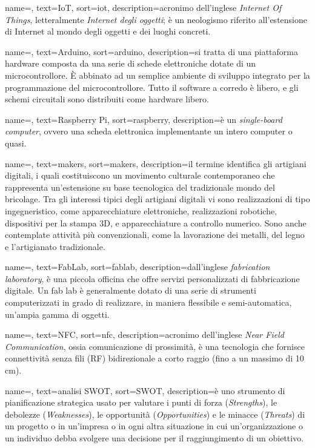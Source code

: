{
	name=,
    text=IoT,
    sort=iot,
    description={acronimo dell'inglese \textit{Internet Of Things}, letteralmente \textit{Internet degli oggetti}; è un neologismo riferito all'estensione di Internet al mondo degli oggetti e dei luoghi concreti.}
}

{
	name=,
    text=Arduino,
    sort=arduino,
    description={si tratta di una piattaforma hardware composta da una serie di schede elettroniche dotate di un microcontrollore. È abbinato ad un semplice ambiente di sviluppo integrato per la programmazione del microcontrollore. Tutto il software a corredo è libero, e gli schemi circuitali sono distribuiti come hardware libero.}
}

{
	name=,
    text=Raspberry Pi,
    sort=raspberry,
    description={è un \textit{single-board computer}, ovvero una scheda elettronica implementante un intero computer o quasi.}
}

{
	name=,
    text=makers,
    sort=makers,
    description={il termine identifica gli artigiani digitali, i quali costituiscono un movimento culturale contemporaneo che rappresenta un'estensione su base tecnologica del tradizionale mondo del bricolage. Tra gli interessi tipici degli artigiani digitali vi sono realizzazioni di tipo ingegneristico, come apparecchiature elettroniche, realizzazioni robotiche, dispositivi per la stampa 3D, e apparecchiature a controllo numerico. Sono anche contemplate attività più convenzionali, come la lavorazione dei metalli, del legno e l'artigianato tradizionale.}
}

{
	name=,
    text=FabLab,
    sort=fablab,
    description={dall'inglese \textit{fabrication laboratory}, è una piccola officina che offre servizi personalizzati di fabbricazione digitale. Un fab lab è generalmente dotato di una serie di strumenti computerizzati in grado di realizzare, in maniera flessibile e semi-automatica, un'ampia gamma di oggetti.}
}

{
	name=,
    text=NFC,
    sort=nfc,
    description={acronimo dell'inglese \textit{Near Field Communication}, ossia comunicazione di prossimità, è una tecnologia che fornisce connettività senza fili (RF) bidirezionale a corto raggio (fino a un massimo di 10 cm).}
}

{
	name=,
    text=analisi SWOT,
    sort=SWOT,
    description={è uno strumento di pianificazione strategica usato per valutare i punti di forza (\textit{Strengths}), le debolezze (\textit{Weaknesses}), le opportunità (\textit{Opportunities}) e le minacce (\textit{Threats}) di un progetto o in un'impresa o in ogni altra situazione in cui un'organizzazione o un individuo debba svolgere una decisione per il raggiungimento di un obiettivo.}
}



